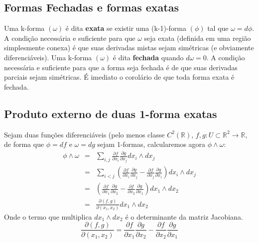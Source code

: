 \subsection{Formas Fechadas e formas exatas} 

Uma k-forma $(\omega)$ é dita \textbf{exata} se existir 
uma (k-1)-forma $(\phi)$ tal que $\omega = d\phi$. 
A condição necessária e suficiente para que $\omega$ seja 
exata (definida em uma região simplesmente conexa) é que 
suas derivadas mistas sejam simétricas (e obviamente 
diferenciáveis). Uma k-forma $(\omega)$ é dita 
\textbf{fechada} quando $d\omega = 0$. A condição 
necessária e suficiente para que a forma seja fechada 
é de que suas derivadas parciais sejam simétricas. 
É imediato o corolário de que toda forma exata é fechada.




\subsection{Produto externo de duas 1-forma exatas}
Sejam duas funções diferenciáveis (pelo menos classe 
$C^2(\mathbb{R})$, $f,g:U\subset\mathbb{R}^2\to \mathbb{R}$, 
de forma que $\phi = df$ e $\omega = dg$ sejam 1-formas, 
calcularemos agora $\phi \wedge \omega$:
%
\begin{eqnarray*}
\phi \wedge \omega &=& \sum_{i,j} \frac{\partial f}{\partial x_i} 
\frac{\partial g}{\partial x_j} dx_i \wedge dx_j 
\\
                   &=& \sum_{i<j}\left(\frac{\partial f}{\partial x_i} 
\frac{\partial g}{\partial x_j} - \frac{\partial f}{\partial x_j} 
\frac{\partial g}{\partial x_i} \right) dx_i \wedge dx_j 
\\
                   &=& \left(\frac{\partial f}{\partial x_1} 
\frac{\partial g}{\partial x_2} 
- \frac{\partial f}{\partial x_2} \frac{\partial g}{\partial x_1} \right) dx_1 
\wedge dx_2 
\\
                   &=& \frac{\partial(f,g)}{\partial(x_1,x_2)} dx_1
\wedge dx_2
\end{eqnarray*}
%
Onde o termo que multiplica $dx_1 \wedge dx_2$ é o determinante 
da matriz Jacobiana. 
%
\[
\frac{\partial(f,g)}{\partial(x_1,x_2)} = 
\frac{\partial f}{\partial x_1} \frac{\partial g}{\partial x_2} 
- \frac{\partial f}{\partial x_2} \frac{\partial g}{\partial x_1}
\]




